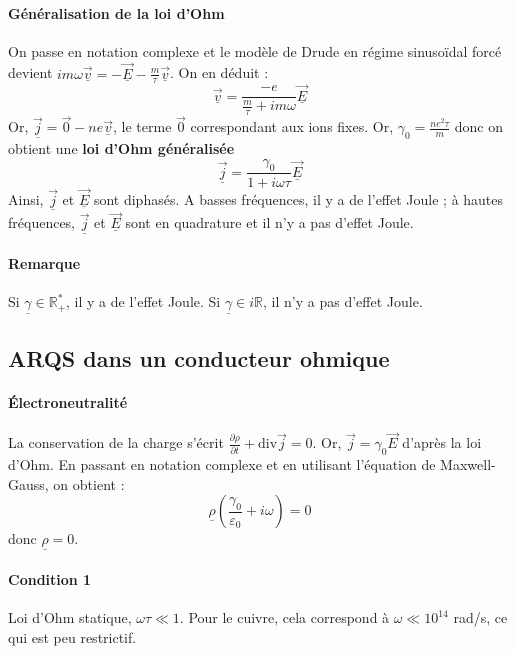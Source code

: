 \documentclass[french]{book}
\theoremstyle{plain}
\theoremstyle{definition}
\theoremstyle{remark}
\newcommand{\R}{\mathbb{R}}
\newcommand{\st}{^*}
\renewcommand{\div}{\text{div}}
\begin{document}
\paragraph{Généralisation de la loi d'Ohm} On passe en notation complexe et le modèle de Drude en régime sinusoïdal forcé devient $im\omega\underline{\overrightarrow{v}}=-\underline{\overrightarrow{E}}-\displaystyle\frac{m}{\tau}\underline{\overrightarrow{v}}$. On en déduit : $$\underline{\overrightarrow{v}}=\frac{-e}{\frac{m}{\tau}+im\omega}\underline{\overrightarrow{E}}$$ Or, $\underline{\overrightarrow{j}}=\overrightarrow{0}-ne\underline{\overrightarrow{v}}$, le terme $\overrightarrow{0}$ correspondant aux ions fixes. Or, $\gamma_0=\displaystyle\frac{ne^2\tau}{m}$ donc on obtient une \textbf{loi d'Ohm généralisée} $$\underline{\overrightarrow{j}}=\frac{\gamma_0}{1+i\omega\tau}\underline{\overrightarrow{E}}$$ Ainsi, $\underline{\overrightarrow{j}}$ et $\underline{\overrightarrow{E}}$ sont diphasés. A basses fréquences, il y a de l'effet Joule ; à hautes fréquences, $\underline{\overrightarrow{j}}$ et $\underline{\overrightarrow{E}}$ sont en quadrature et il n'y a pas d'effet Joule.

\paragraph{Remarque} Si $\underline{\gamma}\in\R_+\st$, il y a de l'effet Joule. Si $\underline{\gamma}\in i\R$, il n'y a pas d'effet Joule.

\subsection{ARQS dans un conducteur ohmique}

\paragraph{Électroneutralité} La conservation de la charge s'écrit $\displaystyle\frac{\partial\rho}{\partial t}+\div\overrightarrow{j}=0$. Or, $\overrightarrow{j}=\gamma_0\overrightarrow{E}$ d'après la loi d'Ohm. En passant en notation complexe et en utilisant l'équation de Maxwell-Gauss, on obtient : $$\underline{\rho}\left(\frac{\gamma_0}{\varepsilon_0}+i\omega\right)=0$$ donc $\underline{\rho}=0$.
\paragraph{Condition 1} Loi d'Ohm statique, $\omega\tau\ll 1$. Pour le cuivre, cela correspond à $\omega \ll 10^{14}$ rad/s, ce qui est peu restrictif.
\end{document}
